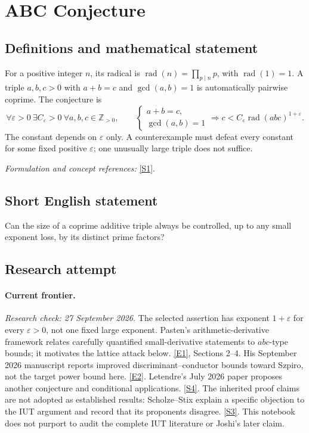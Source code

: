 \documentclass[11pt,a4paper]{article}
\newcommand{\Z}{\mathbb{Z}}
\newcommand{\sref}[2]{\hyperlink{source:#1:#2}{[S#2]}}
\newcommand{\eref}[2]{\hyperlink{extra:#1:#2}{[E#2]}}
\newif\ifshowcatalogue
\newcommand{\cataloguescope}[1]{\ifshowcatalogue
 \paragraph{Exact scope in the supplied catalogue.}
 \begin{quote}\small #1\end{quote}\fi}
\begin{document}
\setcounter{section}{0}
\clearpage
\section*{\texorpdfstring{ABC Conjecture}{ABC Conjecture}}\label{13}
\subsection{Definitions and mathematical statement}
For a positive integer $n$, its radical is $\operatorname{rad}(n)=\prod_{p\mid n}p$, with $\operatorname{rad}(1)=1$. A triple $a,b,c>0$ with $a+b=c$ and $\gcd(a,b)=1$ is automatically pairwise coprime. The conjecture is
\[
 \forall\varepsilon>0\ \exists C_\varepsilon>0\ \forall a,b,c\in\Z_{>0},\qquad
 \begin{cases}a+b=c,\\\gcd(a,b)=1\end{cases}
 \Longrightarrow c<C_\varepsilon\operatorname{rad}(abc)^{1+\varepsilon}.
\]
The constant depends on $\varepsilon$ only. A counterexample must defeat every constant for some fixed positive $\varepsilon$; one unusually large triple does not suffice.
\par\smallskip\textit{Formulation and concept references:} \sref{13}{1}.
\cataloguescope{Prove that for every epsilon > 0, there exists a constant C(epsilon) such that for all coprime positive integers a + b = c, c < C(epsilon) rad(abc)\textasciicircum{}\{1+epsilon\}.}
\subsection{Short English statement}
Can the size of a coprime additive triple always be controlled, up to any small exponent loss, by its distinct prime factors?
\subsection{Research attempt}
\paragraph{Current frontier.}
\textit{Research check: 27 September 2026.}
The selected assertion has exponent $1+\varepsilon$ for every
$\varepsilon>0$, not one fixed large exponent. Pasten's arithmetic-derivative
framework relates carefully quantified small-derivative statements to
$abc$-type bounds; it motivates the lattice attack below.
\eref{13}{1}, Sections 2--4. His September 2026 manuscript reports
improved discriminant--conductor bounds toward Szpiro, not the target
power bound here. \eref{13}{2}. Letendre's July 2026 paper proposes
another conjecture and conditional applications. \sref{13}{4}.
The inherited proof claims are not adopted as established results:
Scholze--Stix explain a specific objection to the IUT argument and record
that its proponents disagree. \sref{13}{3}. This notebook does not purport
to audit the complete IUT literature or Joshi's later claim.
\end{document}
